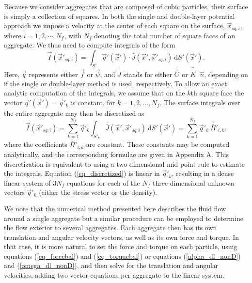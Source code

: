  \par
 Because we consider aggregates that are composed of cubic particles, their surface is simply a collection of squares.
 In both the single and double-layer potential approach we impose a velocity at the center of each square on the surface, $\vec{x}_{sq,i}$, where $i = 1,2, \cdots, N_f$, with $N_f$ denoting the total number of square faces of an aggregate. We thus need to compute integrals of the form
 \begin{equation}
 \vec{I}(\vec{x}'_{sq,i}) = \int_{S'} \vec{q}'(\vec{x}') \cdot {\bar{\bar{J}}} (\vec{x}', \vec{x}'_{sq,i}) \ \text{d} S'(\vec{x}').
 \label{eq_pre_discretize}
 \end{equation}
 Here, $\vec{q}$ represents either $\vec{f}$ or $\vec{\psi}$, and $\bar{\bar{J}}$ stands for  either $\bar{\bar{G}}$ or $\bar{\bar{\bar{K}}}\cdot\hat{n}$, depending on if the single or double-layer method is used, respectively.  To allow an exact analytic computation of the integrals, we assume that on the $k$th square face the vector $\vec{q}'(\vec{x}') = \vec{q}'_k$ is constant, for $k = 1, 2, \dots, N_f$.
 The surface integrals over the entire aggregate may then be discretized as
 \begin{equation}
 \vec{I}(\vec{x}'_{sq,i})  =   \sum_{k=1}^{N_f}  \vec{q}'_k   \int_{S'_{k}} \bar{\bar{J}}(\vec{x}',\vec{x}'_{sq,i}) \ \text{d}S'(\vec{x}') = \sum_{k=1}^{N_f} \vec{q}'_k   \ \bar{\bar{\Pi}}'_{i,k}.
 \label{eq_discretized}
 \end{equation}
 where the coefficients $\bar{\bar{\Pi}}'_{i,k}$ are constant. These constants may be computed analytically, and the corresponding formulae are given in Appendix A.
  This discretization is equivalent to using a two-dimensional mid-point rule to estimate the integrals.  Equation (\ref{eq_discretized}) is linear in $\vec{q}'_k$, resulting in a dense linear system of 3$N_f$ equations for each of the $N_f$ three-dimensional unknown vectors $\vec{q}'_k$ (either the stress vector or the density). 
 \par
 We note that the numerical method presented here describes the fluid flow around a single aggregate but a similar procedure can be employed to determine the flow exterior to several aggregates. Each aggregate then has its own translation and angular velocity vectors, as well as its own force and torque. In that case, it is more natural to set the force and torque on each particle, using equations (\ref{eq_forcebal}) and (\ref{eq_torquebal}) or equations  (\ref{alpha_dl_nonD}) and (\ref{omega_dl_nonD}), and then solve for the translation and angular velocities, adding two vector equations per aggregate to the linear system.
